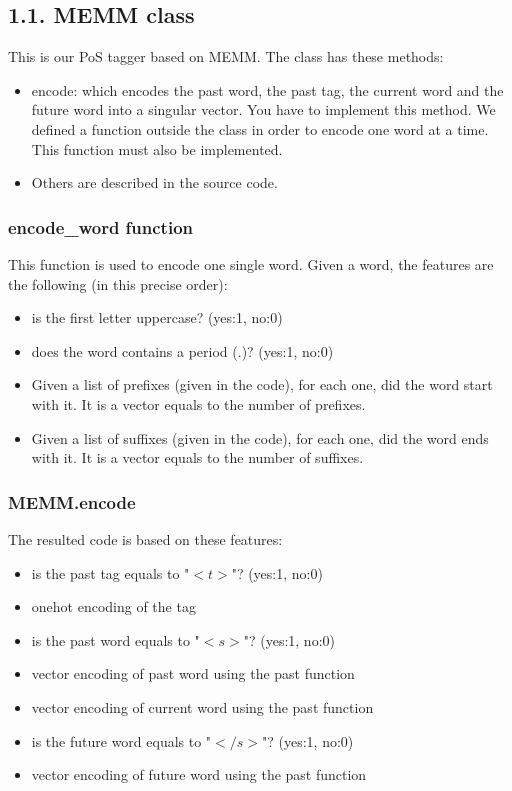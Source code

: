 \documentclass[11pt, a4paper]{article}
\begin{document}
\subsection*{1.1. MEMM class}

This is our PoS tagger based on MEMM.
The class has these methods:
\begin{itemize}
	\item encode: which encodes the past word, the past tag, the current word and the future word into a singular vector.
	You have to implement this method. 
	We defined a function outside the class in order to encode one word at a time.
	This function must also be implemented.
	\item Others are described in the source code.
\end{itemize}

\subsubsection*{encode\_word function}

This function is used to encode one single word.
Given a word, the features are the following (in this precise order):
\begin{itemize}
	\item is the first letter uppercase? (yes:1, no:0)
	\item does the word contains a period (.)? (yes:1, no:0)
	\item Given a list of prefixes (given in the code), for each one, did the word start with it. 
	It is a vector equals to the number of prefixes.
	\item Given a list of suffixes (given in the code), for each one, did the word ends with it. 
	It is a vector equals to the number of suffixes.
\end{itemize}

\subsubsection*{MEMM.encode}

The resulted code is based on these features:
\begin{itemize}
	\item is the past tag equals to "$<t>$"? (yes:1, no:0)
	\item onehot encoding of the tag 
	\item is the past word equals to "$<s>$"? (yes:1, no:0)
	\item vector encoding of past word using the past function
	\item vector encoding of current word using the past function
	\item is the future word equals to "$</s>$"? (yes:1, no:0)
	\item vector encoding of future word using the past function
\end{itemize}
\end{document}
